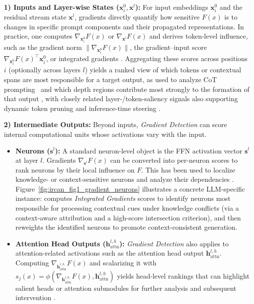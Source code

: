 \documentclass[11pt,letterpaper]{mystyle}
\begin{document}
\textbf{1) Inputs and Layer-wise States ($\mathbf{x}^0_i, \mathbf{x}^l$):}
For input embeddings $\mathbf{x}^0_i$ and the residual stream state $\mathbf{x}^l$, gradients directly quantify how sensitive $F(x)$ is to changes in specific prompt components and their propagated representations.
In practice, one computes $\nabla_{\mathbf{x}^0_i}F(x)$ or $\nabla_{\mathbf{x}^l}F(x)$ and derives token-level influence, such as the gradient norm $\|\nabla_{\mathbf{x}^0_i}F(x)\|$, the gradient--input score $\nabla_{\mathbf{x}^0_i}F(x)^\top \mathbf{x}^0_i$, or integrated gradients \citep{enguehard2023sig}.
Aggregating these scores across positions $i$ (optionally across layers $l$) yields a ranked view of which tokens or contextual spans are most responsible for a target output, as used to analyze CoT prompting~\citep{wu2023analyzing} and which depth regions contribute most strongly to the formation of that output \citep{hou2023layersaliency}, with closely related layer-/token-saliency signals also supporting dynamic token pruning \citep{tao2025sdtp} and inference-time steering \citep{grains2507}.

\textbf{2) Intermediate Outputs:}
Beyond inputs, \textit{Gradient Detection} can score internal computational units whose activations vary with the input.

\begin{itemize}[leftmargin=*]
    \item \textbf{Neurons ($\mathbf{s}^l$):} 
    A standard neuron-level object is the FFN activation vector $\mathbf{s}^l$ at layer $l$.
    Gradients $\nabla_{\mathbf{s}^l}F(x)$ can be converted into per-neuron scores to rank neurons by their local influence on $F$.
    This has been used to localize knowledge- or context-sensitive neurons and analyze their dependencies \citep{dai2022knowledge,ircan_neurips2024,zhang2024cofitune,zhang2024improving,li-etal-2025-happened,li2025instructionreasoningdatashape}.
    Figure~\ref{fig:ircan_fig1_gradient_neurons} illustrates a concrete LLM-specific instance: \citet{ircan_neurips2024} computes \textit{Integrated Gradients} scores to identify neurons most responsible for processing contextual cues under knowledge conflicts (via a context-aware attribution and a high-score intersection criterion), and then reweights the identified neurons to promote context-consistent generation.

    \item \textbf{Attention Head Outputs ($\mathbf{h}_{\text{attn}}^{l,h}$):}
    \textit{Gradient Detection} also applies to attention-related activations such as the attention head output $\mathbf{h}_{\text{attn}}^{l,h}$.
    Computing $\nabla_{\mathbf{h}_\text{attn}^{l,h}}F(x)$ and scalarizing it with $s_j(x)=\phi(\nabla_{\mathbf{h}_{\text{attn}}^{l,h}}F(x), \mathbf{h}_\text{attn}^{l,h})$ yields head-level rankings that can highlight salient heads or attention submodules for further analysis and subsequent intervention \citep{relp2025,gaf_acl2025,liu2025sensmerging}.
\end{itemize}
\end{document}
